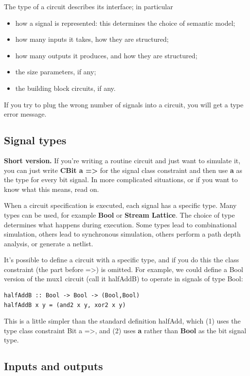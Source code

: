 \documentclass[]{svmono}
\begin{document}
The type of a circuit describes its interface; in particular

\begin{itemize}
\item how a signal is represented: this determines the choice of
semantic model;
\item how many inputs it takes, how they are structured;
\item how many outputs it produces, and how they are structured;
\item the size parameters, if any;
\item the building block circuits, if any.
\end{itemize}

If you try to plug the wrong number of signals into a circuit, you
will get a type error message.
\subsection*{Signal types}
\label{sec:orgd0d1693}

\textbf{Short version.} If you're writing a routine circuit and just want
to simulate it, you can just write \textbf{CBit a =>} for the signal
class constraint and then use \textbf{a} as the type for every bit
signal.  In more complicated situations, or if you want to know
what this means, read on.

When a circuit specification is executed, each signal has a
specific type.  Many types can be used, for example \textbf{Bool} or
\textbf{Stream Lattice}.  The choice of type determines what happens
during execution.  Some types lead to combinational simulation,
others lead to synchronous simulation, others perform a path depth
analysis, or generate a netlist.

It's possible to define a circuit with a specific type, and if you
do this the class constraint (the part before =>) is omitted.  For
example, we could define a Bool version of the mux1 circuit (call
it halfAddB) to operate in signals of type Bool:

\begin{verbatim}
halfAddB :: Bool -> Bool -> (Bool,Bool)
halfAddB x y = (and2 x y, xor2 x y)
\end{verbatim}

This is a little simpler than the standard definition halfAdd,
which (1) uses the type class constraint Bit a =>, and (2) uses
\textbf{a} rather than \textbf{Bool} as the bit signal type.
\subsection*{Inputs and outputs}
\label{sec:org2f05af4}
\end{document}
